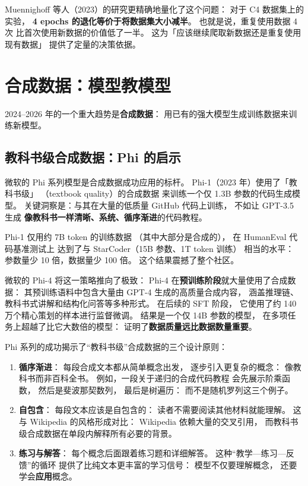 Muennighoff 等人（2023）的研究更精确地量化了这个问题：
对于 C4 数据集上的实验，
\textbf{4 epochs 的退化等价于将数据集大小减半}。
也就是说，重复使用数据 4 次
比首次使用新数据的价值低了一半。
这为「应该继续爬取新数据还是重复使用现有数据」
提供了定量的决策依据。

\section{合成数据：模型教模型}

2024--2026 年的一个重大趋势是\textbf{合成数据}：
用已有的强大模型生成训练数据来训练新模型。

\subsection{教科书级合成数据：Phi 的启示}

微软的 Phi 系列模型是合成数据成功应用的标杆。
Phi-1（2023 年）使用了「教科书级」
（textbook quality）的合成数据
来训练一个仅 1.3B 参数的代码生成模型。
关键洞察是：与其在大量的低质量 GitHub 代码上训练，
不如让 GPT-3.5 生成
\textbf{像教科书一样清晰、系统、循序渐进}的代码教程。

Phi-1 仅用约 7B token 的训练数据
（其中大部分是合成的），
在 HumanEval 代码基准测试上
达到了与 StarCoder（15B 参数、1T token 训练）
相当的水平：
参数量少 10 倍，数据量少 100 倍。
这个结果震撼了整个社区。

微软的 Phi-4 将这一策略推向了极致：
Phi-4 在\textbf{预训练阶段}就大量使用了合成数据：
其预训练语料中包含大量由 GPT-4 生成的高质量合成内容，
涵盖推理链、教科书式讲解和结构化问答等多种形式。
在后续的 SFT 阶段，
它使用了约 140 万个精心策划的样本进行监督微调。
结果是一个仅 14B 参数的模型，
在多项任务上超越了比它大数倍的模型：
证明了\textbf{数据质量远比数据数量重要}。

Phi 系列的成功揭示了“教科书级”合成数据的三个设计原则：

\begin{enumerate}[noitemsep]
  \item \textbf{循序渐进}：
        每段合成文本都从简单概念出发，
        逐步引入更复杂的概念：
        像教科书而非百科全书。
        例如，一段关于递归的合成代码教程
        会先展示阶乘函数，
        然后是斐波那契数列，
        最后是树遍历：
        而不是随机罗列这三个例子。
  \item \textbf{自包含}：
        每段文本应该是自包含的：
        读者不需要阅读其他材料就能理解。
        这与 Wikipedia 的风格形成对比：
        Wikipedia 依赖大量的交叉引用，
        而教科书级合成数据在单段内解释所有必要的背景。
  \item \textbf{练习与解答}：
        每个概念后面跟着练习题和详细解答。
        这种“教学—练习—反馈”的循环
        提供了比纯文本更丰富的学习信号：
        模型不仅要理解概念，
        还要学会\textbf{应用}概念。
\end{enumerate}


